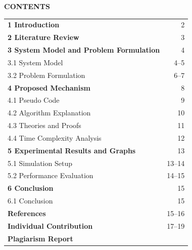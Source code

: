 
\begin{center}
  {\Large\bfseries CONTENTS}
\end{center}

\vspace{1em}

\noindent
\begin{tabular*}{\textwidth}{@{}p{}@{\extracolsep{\fill}}r@{}}
\textbf{1 Introduction} & 2 \\[0.6em]
\textbf{2 Literature Review} & 3 \\[0.6em]
\textbf{3 System Model and Problem Formulation} & 4 \\[0.35em]
\hspace{1.5em} 3.1 System Model & 4--5 \\[0.35em]
\hspace{1.5em} 3.2 Problem Formulation & 6--7 \\[0.6em]
\textbf{4 Proposed Mechanism} & 8 \\[0.35em]
\hspace{1.5em} 4.1 Pseudo Code & 9 \\[0.35em]
\hspace{1.5em} 4.2 Algorithm Explanation & 10 \\[0.35em]
\hspace{1.5em} 4.3 Theories and Proofs & 11 \\[0.35em]
\hspace{1.5em} 4.4 Time Complexity Analysis & 12 \\[0.6em]
\textbf{5 Experimental Results and Graphs} & 13 \\[0.35em]
\hspace{1.5em} 5.1 Simulation Setup & 13--14 \\[0.35em]
\hspace{1.5em} 5.2 Performance Evaluation & 14--15 \\[0.6em]
\textbf{6 Conclusion} & 15 \\[0.35em]
\hspace{1.5em} 6.1 Conclusion & 15 \\[0.6em]
\textbf{References} & 15--16 \\[0.6em]
\textbf{Individual Contribution} & 17--19 \\[0.6em]
\textbf{Plagiarism Report} & \\
\end{tabular*}
